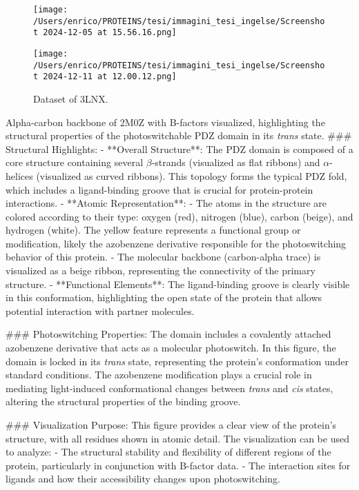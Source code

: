 \documentclass[English, Lau, oneside]{sapthesis}
\begin{document}
\begin{itemize}
\begin{figure}[h!]
    \centering
    \texttt{[image: /Users/enrico/PROTEINS/tesi/immagini\_tesi\_ingelse/Screenshot 2024-12-05 at 15.56.16.png]}
    \caption{}
\end{figure}
\begin{figure}[h!]
    \centering
    \texttt{[image: /Users/enrico/PROTEINS/tesi/immagini\_tesi\_ingelse/Screenshot 2024-12-11 at 12.00.12.png]}
    \caption{Dataset of 3LNX.}
\end{figure}

Alpha-carbon backbone of 2M0Z with B-factors visualized, highlighting the structural properties of the photoswitchable PDZ domain in its \textit{trans} state.
    ### Structural Highlights:
- **Overall Structure**: The PDZ domain is composed of a core structure containing several $\beta$-strands (visualized as flat ribbons) and $\alpha$-helices (visualized as curved ribbons). This topology forms the typical PDZ fold, which includes a ligand-binding groove that is crucial for protein-protein interactions.
- **Atomic Representation**: 
  - The atoms in the structure are colored according to their type: oxygen (red), nitrogen (blue), carbon (beige), and hydrogen (white). The yellow feature represents a functional group or modification, likely the azobenzene derivative responsible for the photoswitching behavior of this protein.
  - The molecular backbone (carbon-alpha trace) is visualized as a beige ribbon, representing the connectivity of the primary structure.
- **Functional Elements**: The ligand-binding groove is clearly visible in this conformation, highlighting the open state of the protein that allows potential interaction with partner molecules.

### Photoswitching Properties:
The domain includes a covalently attached azobenzene derivative that acts as a molecular photoswitch. In this figure, the domain is locked in its \textit{trans} state, representing the protein's conformation under standard conditions. The azobenzene modification plays a crucial role in mediating light-induced conformational changes between \textit{trans} and \textit{cis} states, altering the structural properties of the binding groove.

### Visualization Purpose:
This figure provides a clear view of the protein's structure, with all residues shown in atomic detail. The visualization can be used to analyze:
- The structural stability and flexibility of different regions of the protein, particularly in conjunction with B-factor data.
- The interaction sites for ligands and how their accessibility changes upon photoswitching.



\end{itemize}
\end{document}
